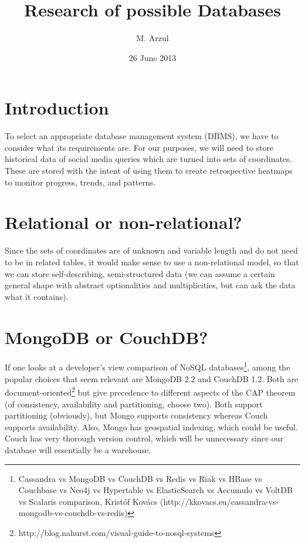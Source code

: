 \documentclass{article}
\title{Research of possible Databases}
\author{M. Arzul}
\date{26 June 2013}
\begin{document}
\maketitle

\section{Introduction}

To select an appropriate database management system (DBMS), we have to consider what its requirements are. For our purposes, we will need to store historical data of social media queries which are turned into sets of coordinates. These are stored with the intent of using them to create retrospective heatmaps to monitor progress, trends, and patterns.

\section{Relational or non-relational?}

Since the sets of coordinates are of unknown and variable length and do not need to be in related tables, it would make sense to use a non-relational model, so that we can store self-describing, semi-structured data (we can assume a certain general shape with abstract optionalities and multiplicities, but can ask the data what it contains).

\section{MongoDB or CouchDB?}

If one looks at a developer's view comparison of NoSQL databases\footnote{Cassandra vs MongoDB vs CouchDB vs Redis vs Riak vs HBase vs Couchbase vs Neo4j vs Hypertable vs ElasticSearch vs Accumulo vs VoltDB vs Scalaris comparison, Krist\'{o}f Kov\'{acs} (http://kkovacs.eu/cassandra-vs-mongodb-vs-couchdb-vs-redis)}, among the popular choices that seem relevant are MongoDB 2.2 and CouchDB 1.2. Both are document-oriented\footnote{http://blog.nahurst.com/visual-guide-to-nosql-systems} but give precedence to different aspects of the CAP theorem (of consistency, availability and partitioning, choose two). Both support partitioning (obviously), but Mongo supports consistency whereas Couch supports availability. Also, Mongo has geospatial indexing, which could be useful. Couch has very thorough version control, which will be unnecessary since our database will essentially be a warehouse.
\end{document}
